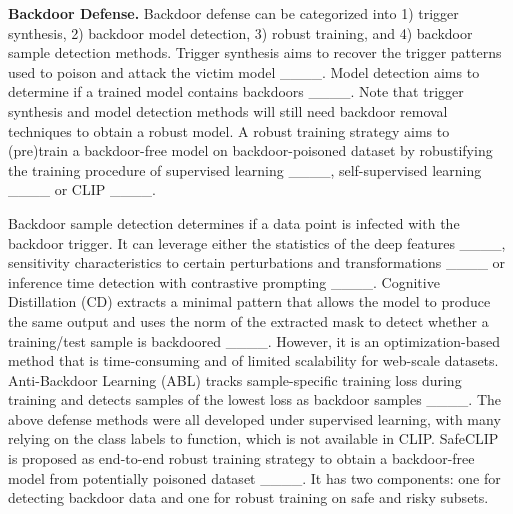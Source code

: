 \noindent\textbf{Backdoor Defense.}
Backdoor defense can be categorized into 1) trigger synthesis, 2) backdoor model detection, 3) robust training, and 4)  backdoor sample detection methods. 
Trigger synthesis aims to recover the trigger patterns used to poison and attack the victim model ____. Model detection aims to determine if a trained model contains backdoors ____. Note that trigger synthesis and model detection methods will still need backdoor removal techniques to obtain a robust model. A robust training strategy aims to (pre)train a backdoor-free model on backdoor-poisoned dataset by robustifying the training procedure of supervised learning ____, self-supervised learning ____ or CLIP ____. 

Backdoor sample detection determines if a data point is infected with the backdoor trigger. 
It can leverage either the statistics of the deep features ____, sensitivity characteristics to certain perturbations and transformations ____ or inference time detection with contrastive prompting ____. Cognitive Distillation (CD) extracts a minimal pattern that allows the model to produce the same output and uses the norm of the extracted mask to detect whether a training/test sample is backdoored ____. However, it is an optimization-based method that is time-consuming and of limited scalability for web-scale datasets.  
 Anti-Backdoor Learning (ABL) tracks sample-specific training loss during training and detects samples of the lowest loss as backdoor samples ____. 
The above defense methods were all developed under supervised learning, with many relying on the class labels to function, which is not available in CLIP.
SafeCLIP is proposed as end-to-end robust training strategy to obtain a backdoor-free model from potentially poisoned dataset ____. 
It has two components: one for detecting backdoor data and one for robust training on safe and risky subsets. 


